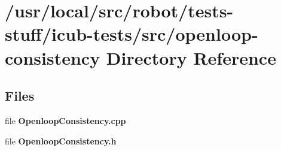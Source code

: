 \section{/usr/local/src/robot/tests-\/stuff/icub-\/tests/src/openloop-\/consistency Directory Reference}
\label{dir_4d564794f5e6690d32405517a9a9695e}
\subsection*{Files}
\begin{DoxyCompactItemize}
\item 
file {\bfseries Openloop\-Consistency.\-cpp}
\item 
file {\bfseries Openloop\-Consistency.\-h}
\end{DoxyCompactItemize}
